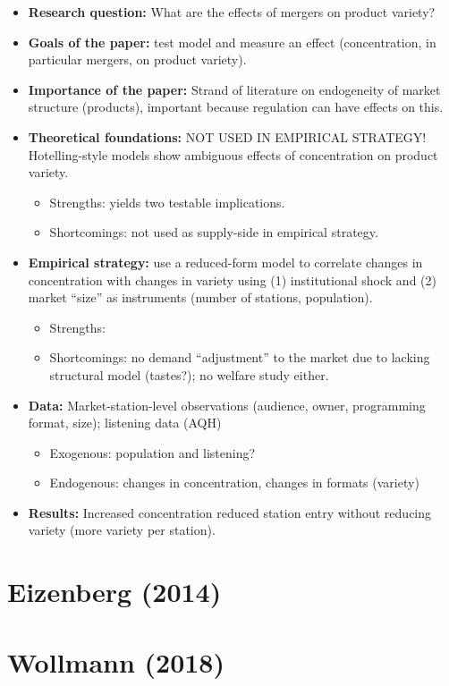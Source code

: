 \begin{itemize}
\item \textbf{Research question:} What are the effects of mergers on product variety?
\item \textbf{Goals of the paper:} test model and measure an effect (concentration, in particular mergers, on product variety).
\item \textbf{Importance of the paper:} Strand of literature on endogeneity of market structure (products), important because regulation can have effects on this.
\item \textbf{Theoretical foundations:}  NOT USED IN EMPIRICAL STRATEGY! Hotelling-style models show ambiguous effects of concentration on product variety. \begin{itemize}
\item Strengths: yields two testable implications.
\item Shortcomings: not used as supply-side in empirical strategy.
\end{itemize}
\item \textbf{Empirical strategy:} use a reduced-form model to correlate changes in concentration with changes in variety using (1) institutional shock and (2) market ``size'' as instruments (number of stations, population).\begin{itemize}
\item Strengths: 
\item Shortcomings: no demand ``adjustment'' to the market due to lacking structural model (tastes?); no welfare study either.
\end{itemize}
\item \textbf{Data:} Market-station-level observations (audience, owner, programming format, size); listening data (AQH)
\begin{itemize}
\item Exogenous: population and listening?
\item Endogenous: changes in concentration, changes in formats (variety)
\end{itemize}
\item \textbf{Results:} Increased concentration reduced station entry without reducing variety (more variety per station).
\end{itemize}

\section{Eizenberg (2014)}



\section{Wollmann (2018)}

